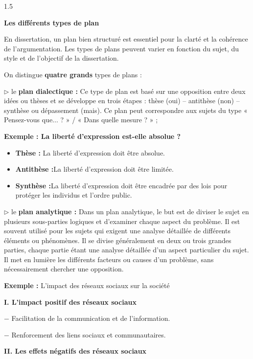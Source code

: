 \documentclass[12pt]{article}
\begin{document}
\begin{spacing}{1.5}
\vspace*{1.5cm}

\textbf{Les différents types de plan}

En dissertation, un plan bien structuré est essentiel pour la clarté et la cohérence de l'argumentation. Les types de plans peuvent varier en fonction du sujet, du style et de l'objectif de la dissertation.
 
On distingue \textbf{ quatre grands} types de plans : 
 
 $\rhd$ le \textbf{plan dialectique :} Ce type de plan est basé sur une opposition entre deux idées ou thèses et se développe en trois étapes : thèse (oui) – antithèse (non) – synthèse ou dépassement (mais). Ce plan peut correspondre aux sujets du type « Pensez-vous que... ? » / « Dans quelle mesure ? » ; 

\textbf{Exemple : La liberté d'expression est-elle absolue ?}

\begin{itemize}
\item \textbf{Thèse :} La liberté d'expression doit être absolue.
\item \textbf{ Antithèse :}La liberté d'expression doit être limitée.
\item \textbf{ Synthèse :}La liberté d'expression doit être encadrée par des lois pour protéger les individus et l'ordre public.\end{itemize}




$\rhd$ le \textbf{plan analytique :} Dans un plan analytique, le but est de diviser le sujet en plusieurs sous-parties logiques et d'examiner chaque aspect du problème. Il est souvent utilisé pour les sujets qui exigent une analyse détaillée de différents éléments ou phénomènes. Il se divise généralement en deux ou trois grandes parties, chaque partie étant une analyse détaillée d'un aspect particulier du sujet.
Il met en lumière les différents facteurs ou causes d'un problème, sans nécessairement chercher une opposition.

\textbf{Exemple :}  L'impact des réseaux sociaux sur la société

\textbf{I. L'impact positif des réseaux sociaux}

$-$ Facilitation de la communication et de l'information.

$-$ Renforcement des liens sociaux et communautaires.

\textbf{II. Les effets négatifs des réseaux sociaux
}


\end{spacing}
\end{document}

